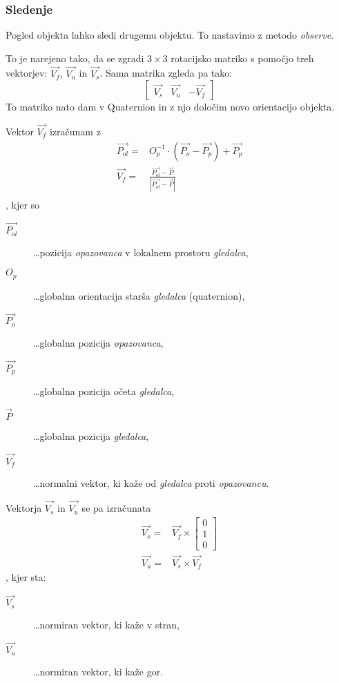 \documentclass[a4paper]{article}
\begin{document}
\subsubsection{Sledenje}
Pogled objekta lahko sledi drugemu objektu. To nastavimo z metodo \emph{observe}.

To je narejeno tako, da se zgradi $3 \times 3$ rotacijsko matriko s pomočjo treh vektorjev: $\overrightarrow{V_f}$, $\overrightarrow{V_u}$ in $\overrightarrow{V_s}$. Sama matrika zgleda pa tako:
$$
\left[ \begin{array}{ccc}
\overrightarrow{V_s} & \overrightarrow{V_u} & - \overrightarrow{V_f}
\end{array} \right]
$$
To matriko nato dam v Quaternion in z njo določim novo orientacijo objekta.

Vektor $\overrightarrow{V_f}$ izračunam z
\begin{eqnarray*}
\overrightarrow{P_{ol}} =& O_p^{-1} \cdot (\overrightarrow{P_o} - \overrightarrow{P_p}) + \overrightarrow{P_p} \\
\overrightarrow{V_f} =& \frac{\overrightarrow{P_{ol}} - \overrightarrow{P}}{\left| \overrightarrow{P_{ol}} - \overrightarrow{P} \right|} \\
\end{eqnarray*},
kjer so
\begin{description}
  \item[$\overrightarrow{P_{ol}}$] \dots pozicija \emph{opazovanca} v lokalnem prostoru \emph{gledalca},
  \item[$O_p$] \dots globalna orientacija starša \emph{gledalca} (quaternion),
  \item[$\overrightarrow{P_o}$] \dots globalna pozicija \emph{opazovanca},
  \item[$\overrightarrow{P_p}$] \dots globalna pozicija očeta \emph{gledalca},
  \item[$\overrightarrow{P}$] \dots globalna pozicija \emph{gledalca},
  \item[$\overrightarrow{V_f}$] \dots normalni vektor, ki kaže od \emph{gledalca} proti \emph{opazovancu}.
\end{description}

Vektorja $\overrightarrow{V_s}$ in $\overrightarrow{V_u}$ se pa izračunata
\begin{eqnarray*}
\overrightarrow{V_s} =& \overrightarrow{V_f} \times \left[\begin{array}{c}0\\1\\ 0\end{array}\right] \\
\overrightarrow{V_u} =& \overrightarrow{V_s} \times \overrightarrow{V_f}
\end{eqnarray*},
kjer sta:
\begin{description}
  \item[$\overrightarrow{V_s}$] \dots normiran vektor, ki kaže v stran,
  \item[$\overrightarrow{V_u}$] \dots normiran vektor, ki kaže gor.
\end{description}
\end{document}

